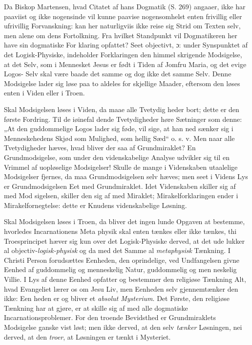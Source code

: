 \documentclass[12pt]{book}
\newcommand{\opage}[1]{\marginnote{\footnotesize\textit{[#1]}}}
\begin{document}
Da Biskop Martensen, hvad Citatet af hans Dogmatik
(S. 269) angaaer, ikke har paaviist og ikke nogensinde vil
kunne paavise nogensomhelst enten frivillig eller ufrivillig
Forvanskning: kan her naturligviis ikke reise sig Strid om
Texten selv, men alene om dens Fortolkning. Fra hvilket
Standpunkt vil Dogmatikeren her have sin dogmatiske For\-%
klaring opfattet? Seet objectivt, ɔ: under Synspunktet af
det Logisk-Physiske, indeholder Forklaringen den himmel\-%
\opage{89}\setcounter{footnote}{0}%
skrigende Modsigelse, at det Selv, som i Mennesket Jesus
er født i Tiden af Jomfru Maria, og det evige Logos-%
Selv skal være baade det samme og dog ikke det samme
Selv. Denne Modsigelse lader sig løse paa to aldeles for\-%
skjellige Maader, eftersom den løses enten i Viden eller i Troen.

Skal Modsigelsen løses i Viden, da maae alle Tvetydig\-%
heder bort; dette er den første Fordring. Til de iøinefal\-%
dende Tvetydigheder høre Sætninger som denne: „At den
guddommelige Logos lader sig føde, vil sige, at han ned\-%
sænker sig i Menneskehedens Skjød som Mulighed, som hellig
Sæd“ o. s. v. Men naar alle Tvetydigheder hæves, hvad
bliver der saa af Grundmiraklet? En Grundmodsigelse, som
under den videnskabelige Analyse udvikler sig til en Vrimmel
af uopløselige Modsigelser! Skulle de mange i Videnskaben
utaalelige Modsigelser fjernes, da maa Grundmodsigelsen selv
hæves; men seet i Videns Lys er Grundmodsigelsen Eet med
Grundmiraklet. Idet Videnskaben skiller sig af med Mod\-%
sigelsen, skiller den sig af med Miraklet; Mirakelforklaringen
ender i Mirakelfornegtelse: dette er Knudens videnskabelige
Løsning.

Skal Modsigelsen løses i Troen, da bliver det ingen\-%
lunde Opgaven at bestemme, hvorledes Incarnationens Meta\-%
physik skal enten tænkes eller ikke tænkes, thi Troesprincipet
hæver sig kun over det Logisk-Physiske derved, at det ude\-%
lukker al objectiv-\emph{logisk-physisk} og da med det Samme
al \emph{metaphysisk} Tænkning. I Christi Person forudsættes
Eenheden, den oprindelige, ved Undfangelsen givne Eenhed
af guddommelig og menneskelig Natur, guddommelig og men\-%
neskelig Villie. I Lys af denne Eenhed opfatter og bestemmer
den religiøse Tænkning Alt, hvad Evangeliet lærer os om
Jesu Liv, men Eenheden selv gjennemtænker den ikke: Een\-%
heden er og bliver et \emph{absolut Mysterium}. Det Første,
den religiøse Tænkning har at gjøre, er at skille sig af med
alle dogmatiske Incarnationsproblemer. For den troende
\opage{90}\setcounter{footnote}{0}%
Bevidsthed er Grundmiraklets Modsigelse ganske vist løst;
men ikke derved, at den selv \emph{tænker} Løsningen, nei derved,
at den \emph{troer}, at Løsningen er tænkt i Mysteriet.
\end{document}
